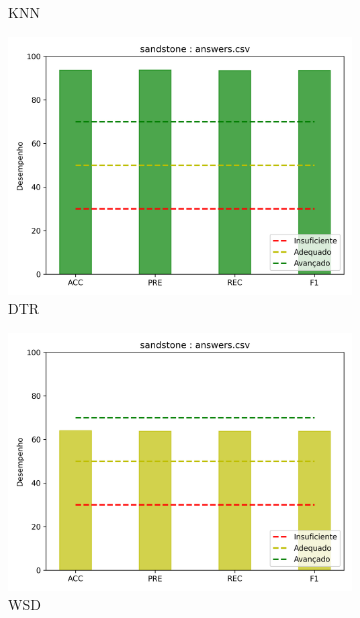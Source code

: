 \begin{figure}[!h]
\begin{subfigure}{0.4\textwidth}
 \caption{KNN}
\end{subfigure}
\hfill
\begin{subfigure}{0.4\textwidth}
 \centering
 \includegraphics[width=\textwidth]{figuras/exemplo/sandstone-evalDTR.png}
 \caption{DTR}
\end{subfigure}
\hfill
\begin{subfigure}{0.4\textwidth}
 \centering
 \includegraphics[width=\textwidth]{figuras/exemplo/sandstone-evalWSD.png}
 \caption{WSD}
\end{subfigure}
\hfill
\begin{subfigure}{0.4\textwidth}
 \centering

\end{subfigure}
\end{figure}
